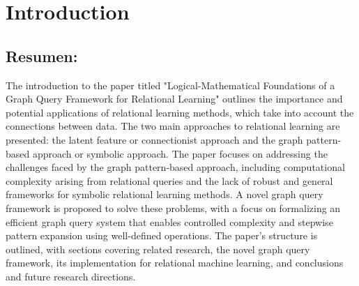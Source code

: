 \documentclass{article}%
\begin{document}
%
\normalsize%
\clearpage%
\section{Introduction}%
\label{sec:Introduction}%
\subsection{Resumen:}%
\label{subsec:Resumen}%
The introduction to the paper titled "Logical{-}Mathematical Foundations of a Graph Query Framework for Relational Learning" outlines the importance and potential applications of relational learning methods, which take into account the connections between data. The two main approaches to relational learning are presented: the latent feature or connectionist approach and the graph pattern{-}based approach or symbolic approach. The paper focuses on addressing the challenges faced by the graph pattern{-}based approach, including computational complexity arising from relational queries and the lack of robust and general frameworks for symbolic relational learning methods. A novel graph query framework is proposed to solve these problems, with a focus on formalizing an efficient graph query system that enables controlled complexity and stepwise pattern expansion using well{-}defined operations. The paper's structure is outlined, with sections covering related research, the novel graph query framework, its implementation for relational machine learning, and conclusions and future research directions.

%
\end{document}
